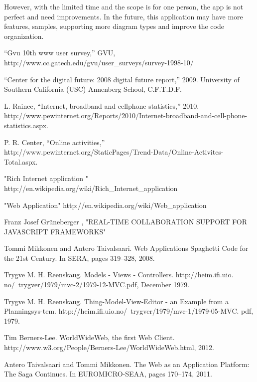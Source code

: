 \documentclass[14pt,a4paper]{extreport}
\begin{document}
		However, with the limited time and the scope is for one person, the app is not perfect and need improvements. In the future, this application may have more features, samples, supporting more diagram types and improve the code organization.


\begin{thebibliography}{99}

 {“Gvu 10th www user survey,” GVU, http://www.cc.gatech.edu/gvu/user\_surveys/survey-1998-10/}

 “Center for the digital future: 2008 digital future report,” 2009. University of Southern California (USC) Annenberg School, C.F.T.D.F.

 {L. Rainee, “Internet, broadband and cellphone statistics,” 2010. http://www.pewinternet.org/Reports/2010/Internet-broadband-and-cell-phone-statistics.aspx.}

 P. R. Center, “Online activities,” http://www.pewinternet.org/StaticPages/Trend-Data/Online-Activites-Total.aspx.

 "Rich Internet application " http://en.wikipedia.org/wiki/Rich\_Internet\_application

 "Web Application" http://en.wikipedia.org/wiki/Web\_application

 Franz Josef Grüneberger , "REAL-TIME COLLABORATION SUPPORT FOR JAVASCRIPT FRAMEWORKS"

 Tommi Mikkonen and Antero Taivalsaari. Web Applications Spaghetti Code for the 21st Century. In SERA, pages 319–328, 2008.

 Trygve M. H. Reenskaug. Models - Views - Controllers. http://heim.ifi.uio.
no/~trygver/1979/mvc-2/1979-12-MVC.pdf, December 1979.

 Trygve M. H. Reenskaug. Thing-Model-View-Editor - an Example from a Planningsys-tem. http://heim.ifi.uio.no/~trygver/1979/mvc-1/1979-05-MVC.
pdf, 1979.

 Tim Berners-Lee. WorldWideWeb, the first Web Client. http://www.w3.org/People/Berners-Lee/WorldWideWeb.html, 2012.

Antero Taivalsaari and Tommi Mikkonen. The Web as an Application Platform: The Saga Continues. In EUROMICRO-SEAA, pages 170–174, 2011.


\end{thebibliography}
\end{document}
